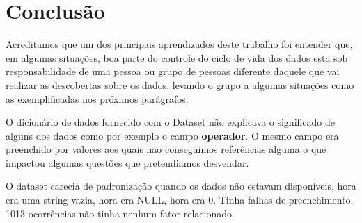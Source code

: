 \documentclass[conference]{IEEEtran}
\begin{document}
%



\section{Conclusão}

Acreditamos que um dos principais aprendizados deste trabalho foi entender que, em algumas situações, boa parte do controle do ciclo de vida dos dados esta sob responsabilidade
de uma pessoa ou grupo de pessoas diferente daquele que vai realizar as descobertas sobre os dados, levando o grupo a algumas situações como as exemplificadas nos próximos
parágrafos.

O dicionário de dados fornecido com o Dataset não explicava o significado de alguns dos dados como por exemplo o campo \textbf{operador}. O mesmo campo era preenchido por
valores aos quais não conseguimos referências alguma o que impactou algumas questões que pretendiamos desvendar.

O dataset carecia de padronização quando os dados não estavam disponíveis, hora era uma string vazia, hora era NULL, hora era 0. Tinha falhas de preenchimento, 1013 ocorrências
não tinha nenhum fator relacionado.
\end{document}
